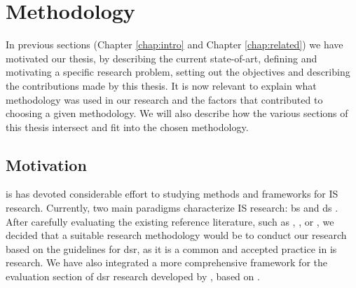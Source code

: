 \chapter{Methodology}

In previous sections (Chapter \ref{chap:intro} and Chapter \ref{chap:related}) we have motivated our thesis, by describing the current state-of-art, defining and motivating a specific research problem, setting out the objectives and describing the contributions made by this thesis. It is now relevant to explain what methodology was used in our research and the factors that contributed to choosing a given methodology. We will also describe how the various sections of this thesis intersect and fit into the chosen methodology.

\section{Motivation}

\gls{is} has devoted considerable effort to studying methods and frameworks for IS research. Currently, two main paradigms characterize IS research: \gls{bs} and \gls{ds} \cite[76]{Hevner:2004:DSI:2017212.2017217}. After carefully evaluating the existing reference literature, such as \cite{Hevner:2004:DSI:2017212.2017217}, \cite{march1995design}, \cite{winter2008design} or \cite{10.2307/40398896}, we decided that a suitable research methodology would be to conduct our research based on the guidelines for \gls{dsr}, as it is a common and accepted practice in \gls{is} research. We have also integrated a more comprehensive framework for the evaluation section of \gls{dsr} research \cite{10.1007/978-3-642-29863-9_31} developed by \citeauthor{10.1007/978-3-642-29863-9_31}, based on \cite{pries2008strategies}.

